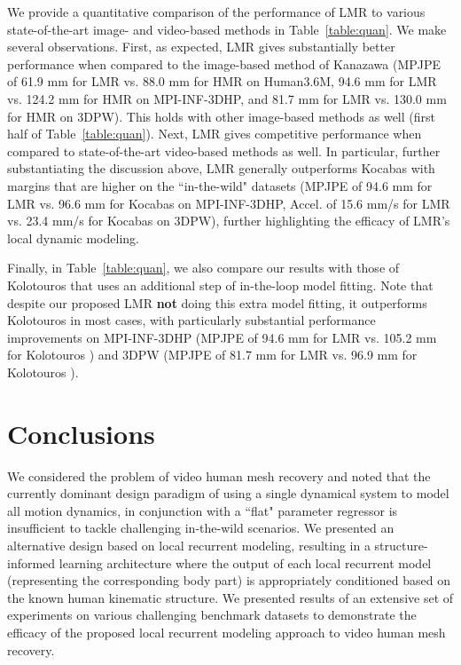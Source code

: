 \documentclass[10pt,twocolumn,letterpaper]{article}
\begin{document}
We provide a quantitative comparison of the performance of LMR to various state-of-the-art image- and video-based methods in Table~\ref{table:quan}. We make several observations. First, as expected, LMR gives substantially better performance when compared to the image-based method of Kanazawa \etal \cite{hmrKanazawa17} (MPJPE of 61.9 mm for LMR vs. 88.0 mm for HMR on Human3.6M, 94.6 mm for LMR vs. 124.2 mm for HMR on MPI-INF-3DHP, and 81.7 mm for LMR vs. 130.0 mm for HMR on 3DPW). This holds with other image-based methods as well (first half of Table~\ref{table:quan}). Next, LMR gives competitive performance when compared to state-of-the-art video-based methods as well. In particular, further substantiating the discussion above, LMR generally outperforms Kocabas \etal \cite{kocabas2019vibe} with margins that are higher on the ``in-the-wild" datasets (MPJPE of 94.6 mm for LMR vs. 96.6 mm for Kocabas \etal \cite{kocabas2019vibe} on MPI-INF-3DHP, Accel. of 15.6 mm/s for LMR vs. 23.4 mm/s for Kocabas \etal \cite{kocabas2019vibe} on 3DPW), further highlighting the efficacy of LMR's local dynamic modeling. 

Finally, in Table~\ref{table:quan}, we also compare our results with those of Kolotouros \etal \cite{kolotouros2019spin} that uses an additional step of in-the-loop model fitting. Note that despite our proposed LMR \textbf{not} doing this extra model fitting, it outperforms Kolotouros \etal \cite{kolotouros2019spin} in most cases, with particularly substantial performance improvements on MPI-INF-3DHP (MPJPE of 94.6 mm for LMR vs. 105.2 mm for Kolotouros \etal \cite{kolotouros2019spin}) and 3DPW (MPJPE of 81.7 mm for LMR vs. 96.9 mm for Kolotouros \etal \cite{kolotouros2019spin}).

\section{Conclusions}
We considered the problem of video human mesh recovery and noted that the currently dominant design paradigm of using a single dynamical system to model all motion dynamics, in conjunction with a ``flat" parameter regressor is insufficient to tackle challenging in-the-wild scenarios. We presented an alternative design based on local recurrent modeling, resulting in a structure-informed learning architecture where the output of each local recurrent model (representing the corresponding body part) is appropriately conditioned based on the known human kinematic structure. We presented results of an extensive set of experiments on various challenging benchmark datasets to demonstrate the efficacy of the proposed local recurrent modeling approach to video human mesh recovery. 




{\small


}
\end{document}
